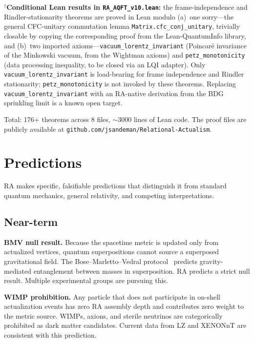 \documentclass[11pt]{article}
\begin{document}
\noindent$^\dagger$\textbf{Conditional Lean results in \texttt{RA\_AQFT\_v10.lean}:} the frame-independence and Rindler-stationarity theorems are proved in Lean modulo (a)~one sorry---the general CFC-unitary commutation lemma \texttt{Matrix.cfc\_conj\_unitary}, trivially closable by copying the corresponding proof from the Lean-QuantumInfo library, and (b)~two imported axioms---\texttt{vacuum\_lorentz\_invariant} (Poincar\'e invariance of the Minkowski vacuum, from the Wightman axioms) and \texttt{petz\_monotonicity} (data processing inequality, to be closed via an LQI adapter). Only \texttt{vacuum\_lorentz\_invariant} is load-bearing for frame independence and Rindler stationarity; \texttt{petz\_monotonicity} is not invoked by these theorems. Replacing \texttt{vacuum\_lorentz\_invariant} with an RA-native derivation from the BDG sprinkling limit is a known open target.

Total: 176+ theorems across 8 files, $\sim$3000 lines of Lean code. The proof files are publicly available at \texttt{github.com/jsandeman/Relational-Actualism}.

\section{Predictions}
\label{sec:predictions}

RA makes specific, falsifiable predictions that distinguish it from standard quantum mechanics, general relativity, and competing interpretations.

\subsection{Near-term}

\textbf{BMV null result.} Because the spacetime metric is updated only from actualized vertices, quantum superpositions cannot source a superposed gravitational field. The Bose--Marletto--Vedral protocol~\cite{Bose2017,Marletto2017} predicts gravity-mediated entanglement between masses in superposition. RA predicts a strict null result. Multiple experimental groups are pursuing this.

\textbf{WIMP prohibition.} Any particle that does not participate in on-shell actualization events has zero RA assembly depth and contributes zero weight to the metric source. WIMPs, axions, and sterile neutrinos are categorically prohibited as dark matter candidates. Current data from LZ and XENONnT are consistent with this prediction.
\end{document}
